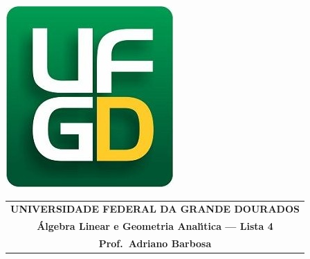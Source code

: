 \documentclass[a4paper,5pt]{amsbook}
\begin{document}
\thispagestyle{empty}
\pagestyle{empty}
\begin{minipage}[h]{0.14\textwidth}
	\includegraphics[scale=0.24]{../../ufgd.png}
\end{minipage}
\begin{minipage}[h]{\textwidth}
\begin{tabular}{c}
{{\bf UNIVERSIDADE FEDERAL DA GRANDE DOURADOS}}\\
{{\bf \'{A}lgebra Linear e Geometria Anal\'{\i}tica --- Lista 4}}\\
{{\bf Prof.\ Adriano Barbosa}}\\
\end{tabular}
\vspace{-0.45cm}
%
\end{minipage}

\vspace{1cm}
\end{document}
